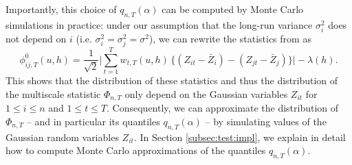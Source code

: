 \documentclass[a4paper,12pt]{article}
\makeatletter
\renewcommand{\eqref}[1]{\tagform@{\ref{#1}}}
\makeatother
\begin{document}
\begin{remark}
Importantly, this choice of $q_{n,T}(\alpha)$ can be computed by Monte Carlo simulations in practice: under our assumption that the long-run variance $\sigma_i^2$ does not depend on $i$ (i.e. $\sigma_i^2 = \sigma^2_j = \sigma^2$), we can rewrite the statistics from \eqref{eq:phi_zero_ij} as
\[\phi^0_{ij, T}(u, h) = \frac{1}{\sqrt{2}} \Big|\sum\limits_{t=1}^T w_{t,T}(u, h) \, \big\{ (Z_{it} - \bar{Z}_i) - (Z_{jt} - \bar{Z}_j) \big\}\Big| - \lambda(h). \] 
This shows that the distribution of these statistics and thus the distribution of the multiscale statistic $\Phi_{n,T}$ only depend on the Gaussian variables $Z_{it}$ for $1 \le i \le n$ and $1 \le t \le T$. Consequently, we can approximate the distribution of $\Phi_{n,T}$ -- and in particular its quantiles $q_{n,T}(\alpha)$ -- by simulating values of the Gaussian random variables $Z_{it}$. In Section \ref{subsec:test:impl}, we explain in detail how to compute Monte Carlo approximations of the quantiles $q_{n,T}(\alpha)$. 
\end{remark}


\end{document}
